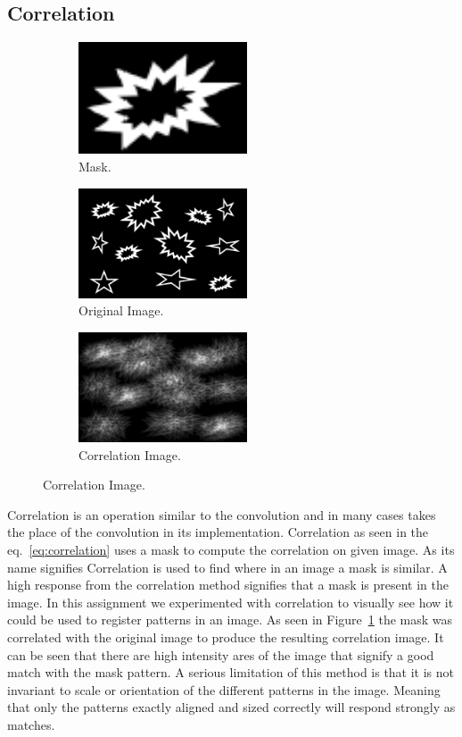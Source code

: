 \documentclass[letterpaper,10pt]{article}
\begin{document}
\subsection{Correlation}
\begin{figure}[hbtp]
  \centering
  \begin{subfigure}{5cm}
    \includegraphics[width=5cm]{images/Pattern.png}
    \caption{Mask.}
  \end{subfigure}
  \begin{subfigure}{5cm}
    \includegraphics[width=5cm]{images/Image.png}
    \caption{Original Image.}
  \end{subfigure}
  \begin{subfigure}{5cm}
    \includegraphics[width=5cm]{images/correlation.png}
    \caption{Correlation Image.}
  \end{subfigure}
  \label{fig:correlations}
\end{figure}

Correlation is an operation similar to the convolution and in many cases takes the place of the convolution in its implementation. Correlation as seen in the eq.~\ref{eq:correlation} uses a mask to compute the correlation on given image. As its name signifies Correlation is used to find where in an image a mask is similar. A high response from the correlation method signifies that a mask is present in the image. In this assignment we experimented with correlation to visually see how it could be used to register patterns in an image. As seen in Figure~\ref{fig:correlations} the mask was correlated with the original image to produce the resulting correlation image. It can be seen that there are high intensity ares of the image that signify a good match with the mask pattern. A serious limitation of this method is that it is not invariant to scale or orientation of the different patterns in the image. Meaning that only the patterns exactly aligned and sized correctly will respond strongly as matches.
\end{document}
